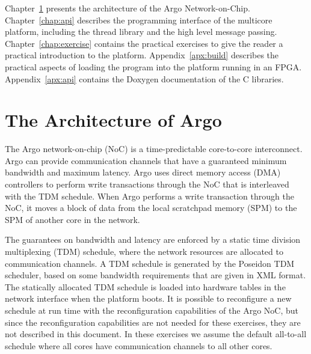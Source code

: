 \documentclass[a4paper,fontsize=10pt,twoside,DIV15,BCOR12mm,headinclude=true,footinclude=false,pagesize,bibtotoc]{scrbook}
\begin{document}
Chapter~\ref{chap:arch} presents the architecture of the Argo Network-on-Chip.
Chapter~\ref{chap:api} describes the programming interface of the multicore platform, including the thread library and the high level message passing.
Chapter~\ref{chap:exercise} contains the practical exercises to give the reader a practical introduction to the platform.
Appendix~\ref{apx:build} describes the practical aspects of loading the program into the platform running in an FPGA.
Appendix~\ref{apx:api} contains the Doxygen documentation of the C libraries.


\chapter{The Architecture of Argo}
\label{chap:arch}
The Argo network-on-chip (NoC) is a time-predictable core-to-core interconnect. Argo can provide communication channels that have a guaranteed minimum bandwidth and maximum latency.
Argo uses direct memory access (DMA) controllers to perform write transactions through the NoC that is interleaved with the TDM schedule.
When Argo performs a write transaction through the NoC, it moves a block of data from the local scratchpad memory (SPM) to the SPM of another core in the network.


The guarantees on bandwidth and latency are enforced by a static time division multiplexing (TDM) schedule, where the network resources are allocated to communication channels.
A TDM schedule is generated by the Poseidon TDM scheduler, based on some bandwidth requirements that are given in XML format.
The statically allocated TDM schedule is loaded
into hardware tables in the network interface when the platform boots.
It is possible to reconfigure a new schedule at run time with the reconfiguration capabilities of the Argo NoC, but since the reconfiguration capabilities are not needed for these exercises, they are not described in this document.
In these exercises we assume the default all-to-all schedule where all cores have communication channels to all other cores.
\end{document}
